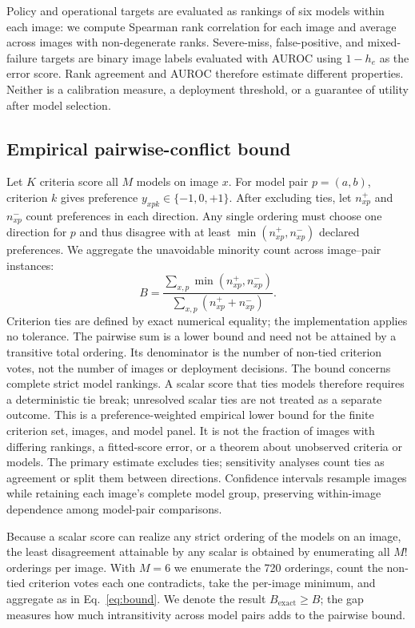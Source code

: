 Policy and operational targets are evaluated as rankings of six models within
each image: we compute Spearman rank correlation for each image and average
across images with non-degenerate ranks. Severe-miss, false-positive, and
mixed-failure targets are binary image labels evaluated with AUROC using
$1-h_e$ as the error score. Rank agreement and AUROC therefore estimate
different properties. Neither is a calibration measure, a deployment
threshold, or a guarantee of utility after model selection.

\subsection{Empirical pairwise-conflict bound}
Let $K$ criteria score all $M$ models on image $x$. For model pair
$p=(a,b)$, criterion $k$ gives preference $y_{xpk}\in\{-1,0,+1\}$. After
excluding ties, let $n^+_{xp}$ and $n^-_{xp}$ count preferences in each
direction. Any single ordering must choose one direction for $p$ and thus
disagree with at least $\min(n^+_{xp},n^-_{xp})$ declared preferences. We
aggregate the unavoidable minority count across image--pair instances:
\begin{equation}
 B =
 \frac{\sum_{x,p}\min(n^+_{xp},n^-_{xp})}
      {\sum_{x,p}(n^+_{xp}+n^-_{xp})}.
 \label{eq:bound}
\end{equation}
Criterion ties are defined by exact numerical equality; the implementation
applies no tolerance. The pairwise sum is a lower bound and need not be
attained by a transitive total ordering. Its denominator is the number of
non-tied criterion votes, not the number of images or deployment decisions.
The bound concerns complete strict model rankings. A scalar score that ties
models therefore requires a deterministic tie break; unresolved scalar ties
are not treated as a separate outcome. This is a preference-weighted empirical
lower bound for the finite criterion
set, images, and model panel. It is not the fraction of images with differing
rankings, a fitted-score error, or a theorem about unobserved criteria or
models. The primary estimate excludes ties; sensitivity analyses count ties
as agreement or split them between directions. Confidence intervals resample
images while retaining each image's complete model group, preserving
within-image dependence among model-pair comparisons.

Because a scalar score can realize any strict ordering of the models on an
image, the least disagreement attainable by any scalar is obtained by
enumerating all $M!$ orderings per image. With $M=6$ we enumerate the 720
orderings, count the non-tied criterion votes each one contradicts, take the
per-image minimum, and aggregate as in Eq.~\ref{eq:bound}. We denote the
result $B_{\mathrm{exact}}\geq B$; the gap measures how much intransitivity
across model pairs adds to the pairwise bound.

